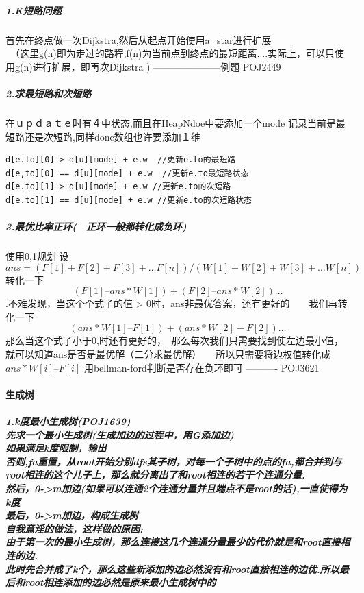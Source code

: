 \documentclass{article}
\begin{document}
\subparagraph{1.K短路问题\\}
首先在终点做一次Dijkstra,然后从起点开始使用a\_star进行扩展\\　（这里g(n)即为走过的路程,f(n)为当前点到终点的最短距离....实际上，可以只使用g(n)进行扩展，即再次Dijkstra )    ---------------------例题 POJ2449
\subparagraph{2.求最短路和次短路\\}
在ｕｐｄａｔｅ时有４中状态,而且在HeapNdoe中要添加一个mode 记录当前是最短路还是次短路,同样done数组也许要添加１维
\begin{lstlisting}
d[e.to][0] > d[u][mode] + e.w  //更新e.to的最短路
d[e,to][0] == d[u][mode] + e.w  //更新e.to最短路状态
d[e.to][1] > d[u][mode] + e.w //更新e.to的次短路
d[e.to][1] == d[u][mode] + e.w //更新e.to的次短路状态
\end{lstlisting}

\subparagraph{3.最优比率正环(　正环一般都转化成负环)\\}
使用0,1规划  设$$ans =  (F[1] + F[2] + F[3] + … F[n] ) / ( W[1] + W[2] + W[3] + … W[n] )$$
转化一下$$( F[1] – ans*W[1]  ) + ( F[2] – ans*W[2]  ) …$$.不难发现，当这个个式子的值 > 0时，ans非最优答案，还有更好的　　我们再转化一下$$(  ans*W[1] – F[1] ) +  ( ans*W[2] - F[2] ) … $$
那么当这个式子小于0,时还有更好的，　那么每次我们只需要找到使左边最小值，就可以知道ans是否是最优解（二分求最优解）　　所以只需要将边权值转化成 $ans*W[i] – F[i]$ 用bellman-ford判断是否存在负环即可  ---------- POJ3621
\paragraph{生成树}
\subparagraph{1.k度最小生成树(POJ1639)\\
先求一个最小生成树(生成加边的过程中，用G添加边)\\
如果满足k度限制，输出\\
否则,fa重置，从root开始分别dfs其子树，对每一个子树中的点的fa,都合并到与root相连的这个儿子上，那么就分离出了和root相连的若干个连通分量.\\
然后，0->m加边(如果可以连通2个连通分量并且端点不是root的话),一直使得为k度\\
最后，0->m加边，构成生成树 \\
自我意淫的做法，这样做的原因: \\ 由于第一次的最小生成树，那么连接这几个连通分量最少的代价就是和root直接相连的边.\\ 此时先合并成了k个，那么这些新添加的边必然没有和root直接相连的边优.所以最后和root相连添加的边必然是原来最小生成树中的}
\end{document}
